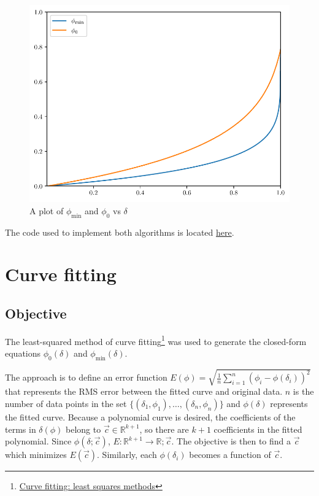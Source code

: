 \begin{figure}[H]
    \centering
    \includegraphics[]{plots/phi-functions.pdf}
    \caption{A plot of $\phi_\mathrm{min}$ and $\phi_0$ vs $\delta$}\label{phifig}
\end{figure}

The code used to implement both algorithms is located \href{https://gist.github.com/sidnb13/d715682a9915ec4cf49d66ceb2e54855}{here}.

\section{Curve fitting}

\subsection{Objective}

The least-squared method of curve fitting\footnote{\href{https://www.dam.brown.edu/people/alcyew/handouts/leastsq.pdf}{Curve fitting: least squares methods}} was used to generate the closed-form equations $\phi_0(\delta)$ and $\phi_\mathrm{min}(\delta)$.

The approach is to define an error function $E(\phi)=\sqrt{\frac{1}{n}\sum_{i=1}^n(\phi_i-\phi(\delta_i))^2}$ that represents the RMS error between the fitted curve and original data. $n$ is the number of data points in the set $\{(\delta_1,\phi_1),\ldots,(\delta_n,\phi_n)\}$ and $\phi(\delta)$ represents the fitted curve.
Because a polynomial curve is desired, the coefficients of the terms in $\delta(\phi)$ belong to $\vec c\in \mathbb{R}^{k+1}$, so there are $k+1$ coefficients in the fitted polynomial. Since $\phi(\delta;\vec{c})$, $E:\mathbb{R}^{k+1}\to \mathbb{R};\vec{c}$. The objective is then to find a $\vec{c}$ which minimizes $E(\vec{c})$. Similarly, each $\phi(\delta_i)$ becomes a function of $\vec{c}$.

